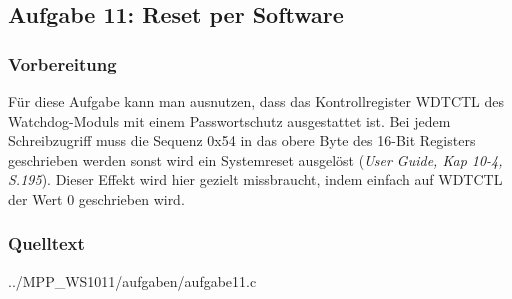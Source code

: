 \subsection*{Aufgabe 11: Reset per Software}

\subsubsection*{Vorbereitung}

Für diese Aufgabe kann man ausnutzen, dass das Kontrollregister WDTCTL
des Watchdog-Moduls mit einem Passwortschutz ausgestattet ist. Bei jedem
Schreibzugriff muss die Sequenz 0x54 in das obere Byte des 16-Bit
Registers geschrieben werden sonst wird ein Systemreset ausgelöst
({\it User Guide, Kap 10-4, S.195}). Dieser Effekt wird hier gezielt missbraucht,
indem einfach auf WDTCTL der Wert 0 geschrieben wird.

\subsubsection*{Quelltext}


{../MPP_WS1011/aufgaben/aufgabe11.c}
